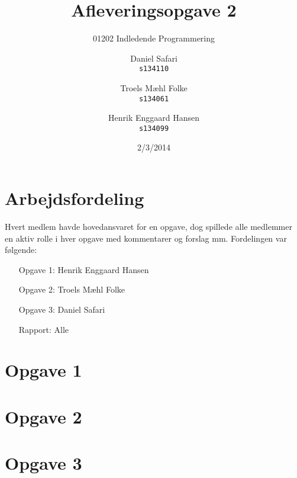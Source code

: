 \documentclass{scrartcl}
\begin{document}

\title{Afleveringsopgave 2}
\subtitle{01202 Indledende Programmering}
\author{
  Daniel Safari\\
  \texttt{s134110}
  \and
  Troels Mæhl Folke\\
  \texttt{s134061}
   \and
  Henrik Enggaard Hansen\\
  \texttt{s134099}
}
\date{2/3/2014}
\maketitle
\thispagestyle{empty}
\setcounter{page}{0}
\null
\vfill
\section*{Arbejdsfordeling}

Hvert medlem havde hovedansvaret for en opgave, dog spillede alle medlemmer en
aktiv rolle i hver opgave med kommentarer og forslag mm. Fordelingen var
følgende:
\begin{itemize}
\setlength{\itemindent}{3em}
\item[Opgave 1:] Henrik Enggaard Hansen
\item[Opgave 2:] Troels Mæhl Folke
\item[Opgave 3:] Daniel Safari
\item[Rapport:]  Alle
\end{itemize}
\newpage
\section*{Opgave 1}



\section*{Opgave 2}



\section*{Opgave 3}
\end{document}
